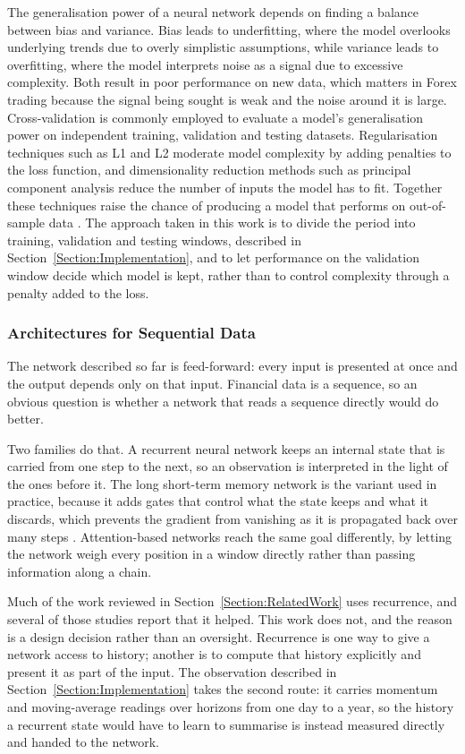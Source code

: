 The generalisation power of a neural network depends on finding a balance between bias and variance. Bias leads to underfitting, where the model overlooks underlying trends due to overly simplistic assumptions, while variance leads to overfitting, where the model interprets noise as a signal due to excessive complexity. Both result in poor performance on new data, which matters in Forex trading because the signal being sought is weak and the noise around it is large. Cross-validation is commonly employed to evaluate a model's generalisation power on independent training, validation and testing datasets. Regularisation techniques such as L1 and L2 moderate model complexity by adding penalties to the loss function, and dimensionality reduction methods such as principal component analysis reduce the number of inputs the model has to fit. Together these techniques raise the chance of producing a model that performs on out-of-sample data \cite{goodfellow_deep_2016}. The approach taken in this work is to divide the period into training, validation and testing windows, described in Section~\ref{Section:Implementation}, and to let performance on the validation window decide which model is kept, rather than to control complexity through a penalty added to the loss.

\subsubsection{Architectures for Sequential Data}

The network described so far is feed-forward: every input is presented at once and the output depends only on that input. Financial data is a sequence, so an obvious question is whether a network that reads a sequence directly would do better.

Two families do that. A recurrent neural network keeps an internal state that is carried from one step to the next, so an observation is interpreted in the light of the ones before it. The long short-term memory network is the variant used in practice, because it adds gates that control what the state keeps and what it discards, which prevents the gradient from vanishing as it is propagated back over many steps \cite{goodfellow_deep_2016}. Attention-based networks reach the same goal differently, by letting the network weigh every position in a window directly rather than passing information along a chain.

Much of the work reviewed in Section~\ref{Section:RelatedWork} uses recurrence, and several of those studies report that it helped. This work does not, and the reason is a design decision rather than an oversight. Recurrence is one way to give a network access to history; another is to compute that history explicitly and present it as part of the input. The observation described in Section~\ref{Section:Implementation} takes the second route: it carries momentum and moving-average readings over horizons from one day to a year, so the history a recurrent state would have to learn to summarise is instead measured directly and handed to the network.

